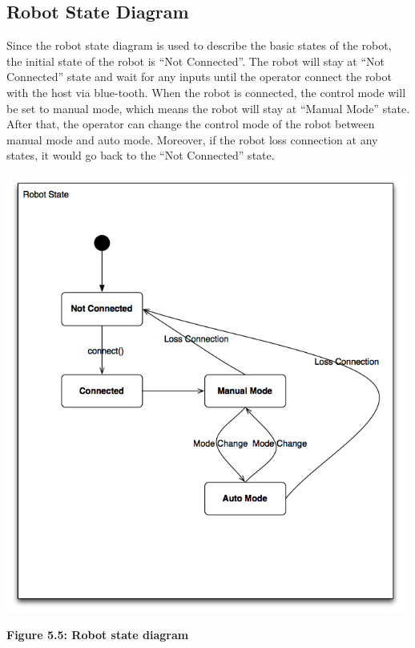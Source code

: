 \documentclass[11pt, a4paper]{report}
\begin{document}
\subsection{Robot State Diagram}
Since the robot state diagram is used to describe the basic states of the robot, the initial state of the robot is ``Not Connected''.  The robot will stay at ``Not Connected'' state and wait for any inputs until the operator connect the robot with the host via blue-tooth. When the robot is connected, the control mode will be set to manual mode, which means the robot will stay at ``Manual Mode'' state. After that, the operator can change the control mode of the robot between manual mode and auto mode. Moreover, if the robot loss connection at any states, it would go back to the ``Not Connected'' state.
 \begin{center}
 \includegraphics[width=13.20cm]{RobotState.png}
\end{center}
\begin{center}
\textbf {Figure 5.5: Robot state diagram} \\[0.3cm]
\end{center}
\pagebreak
\end{document}
